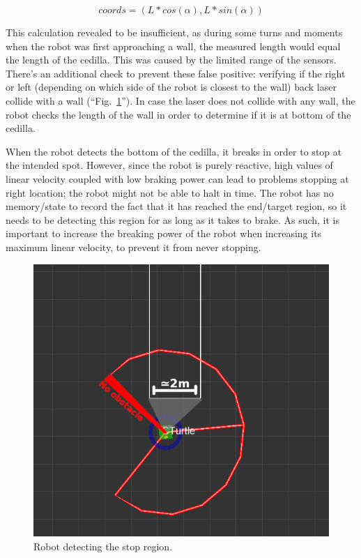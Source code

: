 \documentclass[conference]{IEEEtran}
\begin{document}
\begin{equation}
coords = (L * cos(\alpha), L * sin(\alpha)) \label{eq:coords}
\end{equation}

This calculation revealed to be insufficient, as during some turns and moments when the robot was first approaching a wall, the measured length would equal the length of the cedilla. This was caused by the limited range of the sensors. There's an additional check to prevent these false positive: verifying if the right or left (depending on which side of the robot is closest to the wall) back laser collide with a wall (``Fig.~\ref{fig:stop_region}''). In case the laser does not collide with any wall, the robot checks the length of the wall in order to determine if it is at bottom of the cedilla. 

When the robot detects the bottom of the cedilla, it breaks in order to stop at the intended spot. However, since the robot is purely reactive, high values of linear velocity coupled with low braking power can lead to problems stopping at right location; the robot might not be able to halt in time. The robot has no memory/state to record the fact that it has reached the end/target region, so it needs to be detecting this region for as long as it takes to brake. As such, it is important to increase the breaking power of the robot when increasing its maximum linear velocity, to prevent it from never stopping.

\begin{figure}[htbp]
    \centerline{\includegraphics{images/stop_region.png}}
    \caption{Robot detecting the stop region.}
    \label{fig:stop_region}
\end{figure}
\end{document}
